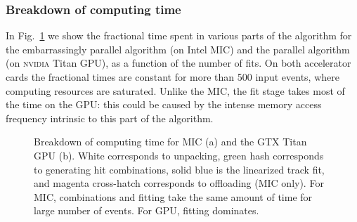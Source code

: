 \documentclass[a4]{jpconf}
\begin{document}
\subsubsection{Breakdown of computing time}
In Fig.~\ref{fig:breakdown} we show the fractional time spent in
various parts of the algorithm for the embarrassingly parallel algorithm 
(on Intel MIC) and the parallel algorithm (on \textsc{nvidia} Titan GPU), as a 
function of the number of fits. On both accelerator cards the fractional times
are constant for more than 500 input events, where computing resources are saturated. 
Unlike the MIC, the fit stage takes most of the time on the GPU: this 
could be caused by the intense memory access frequency intrinsic to
this part of the algorithm.  
\begin{figure}[tbp]
\centering
{}
\caption{Breakdown of computing time for MIC (a) and the GTX Titan GPU
  (b). White corresponds to unpacking, green hash corresponds to
  generating hit combinations, solid blue is the linearized track fit,
  and magenta cross-hatch corresponds to offloading (MIC only). For
  MIC, combinations and fitting take the same amount of time for large
  number of events. For GPU, fitting dominates. }
\label{fig:breakdown}
\end{figure}
\end{document}
